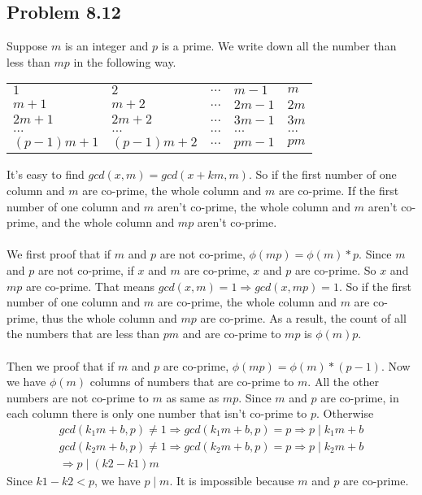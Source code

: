 \documentclass[acmlarge,screen]{acmart}
\begin{document}
\begin{CJK*}{UTF8}{gbsn}
\section{Problem 8.12}
Suppose $m$ is an integer and $p$ is a prime. We write down all the number than less than $mp$ in the following way.
\begin{center}
	\begin{tabular}{m{5em} m{5em} m{5em} m{5em} m{5em}}
    $1$&$2$&$...$&$m-1$&$m$\\
    $m+1$&$m+2$&$...$&$2m-1$&$2m$\\
    $2m+1$&$2m+2$&$...$&$3m-1$&$3m$\\
    $...$&$...$&$...$&$...$&$...$\\
    $(p-1)m+1$&$(p-1)m+2$&$...$&$pm-1$&$pm$\\
\end{tabular}
\end{center}
It's easy to find $gcd(x,m)=gcd(x+km, m)$. So if the first number of one column and $m$ are co-prime, the whole column and $m$ are co-prime. If the first number of one column and $m$ aren't co-prime, the whole column and $m$ aren't co-prime, and the whole column and $mp$ aren't co-prime.\\\\
We first proof that if $m$ and $p$ are not co-prime, $\phi(mp)=\phi(m)*p$. Since $m$ and $p$ are not co-prime, if $x$ and $m$ are co-prime, $x$ and $p$ are co-prime. So $x$ and $mp$ are co-prime. That means $gcd(x, m)=1\Rightarrow gcd(x, mp)=1$. So if the first number of one column and $m$ are co-prime, the whole column and $m$ are co-prime, thus the whole column and $mp$ are co-prime. As a result, the count of all the numbers that are less than $pm$ and are co-prime to $mp$ is $\phi(m)p$.\\\\
Then we proof that if $m$ and $p$ are co-prime, $\phi(mp)=\phi(m)*(p-1)$. Now we have $\phi(m)$ columns of numbers that are co-prime to $m$. All the other numbers are not co-prime to $m$ as same as $mp$. Since $m$ and $p$ are co-prime, in each column there is only one number that isn't co-prime to $p$. Otherwise
\begin{align*}
	gcd(k_1m+b,p)\neq1 \Rightarrow gcd(k_1m+b,p)=p \Rightarrow p\mid k_1m+b\\
	gcd(k_2m+b,p)\neq1 \Rightarrow gcd(k_2m+b,p)=p \Rightarrow p\mid k_2m+b\\
	\Rightarrow p \mid(k2-k1)m
\end{align*}
Since $k1-k2<p$, we have $p\mid m$. It is impossible because $m$ and $p$ are co-prime.\\\\

\end{CJK*}
\end{document}
